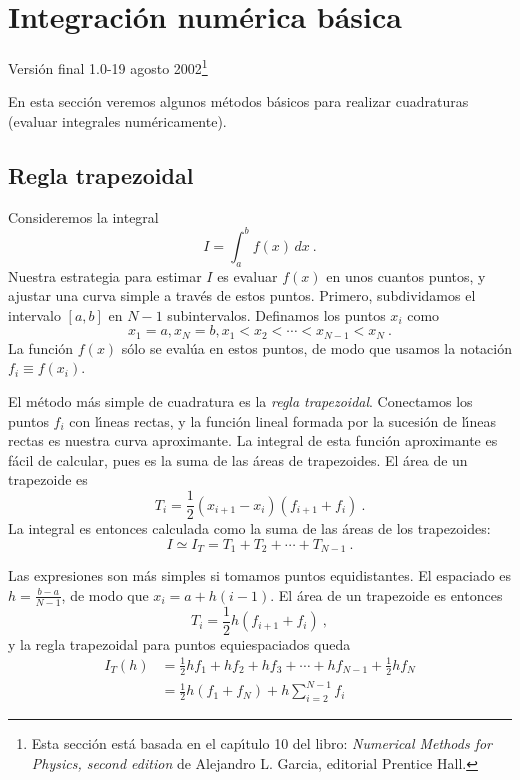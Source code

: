 \documentclass[12pt]{article}
\begin{document}
\section{Integraci\'on num\'erica b\'asica}

\hfill{\tiny Versi\'on final 1.0-19 agosto 2002\footnote{Esta secci\'on
    est\'a basada en el  cap{\'\i}tulo 10 del libro: {\em Numerical
      Methods for Physics, second edition} de Alejandro L. Garcia,
    editorial {\sc Prentice Hall}.}}

En esta secci\'on veremos algunos m\'etodos b\'asicos para
realizar cuadraturas (evaluar integrales num\'ericamente).

\subsection{Regla trapezoidal}

Consideremos la integral
\begin{equation}
I = \int_a^b f(x)\, dx \ .  
\end{equation}
Nuestra estrategia para estimar $I$ es evaluar $f(x)$ en unos cuantos
puntos, y ajustar una curva simple a trav\'es de estos
puntos. Primero, subdividamos el intervalo $[a,b]$ en $N-1$
subintervalos. Definamos los puntos $x_i$ como
$$ x_1=a, x_N=b, x_1<x_2<\cdots<x_{N-1}<x_N \ . $$
La funci\'on $f(x)$ s\'olo se eval\'ua en estos puntos, de modo que
usamos la notaci\'on $f_i\equiv f(x_i)$.

El m\'etodo m\'as simple de cuadratura es la {\em regla
  trapezoidal}. Conectamos los puntos $f_i$ con l\'{\i}neas rectas, y
la funci\'on lineal formada por la sucesi\'on de l\'{\i}neas rectas es
nuestra curva aproximante. La integral de esta funci\'on aproximante
es f\'acil de calcular, pues es la suma de las \'areas de
trapezoides. El \'area de un trapezoide es
$$ T_i = \frac 12 (x_{i+1}-x_i)(f_{i+1}+f_i) \ . $$
La integral es entonces calculada como la suma de las \'areas de los
trapezoides:
$$ I \simeq I_T = T_1 + T_2 + \cdots + T_{N-1} \ . $$

Las expresiones son m\'as simples si tomamos puntos equidistantes. El
espaciado es $h=\frac{b-a}{N-1}$, de modo que $x_i = a+h(i-1)
$. El \'area de un trapezoide es entonces
$$ T_i = \frac 12 h (f_{i+1}+f_i) \ , $$
y la regla trapezoidal para puntos equiespaciados queda
\begin{align}
  I_T(h) &= \frac 12 h f_1 + h f_2 + h f_3 + \cdots + h f_{N-1} +
  \frac 12 h f_N \nonumber \\
&= \frac 12 h(f_1+f_N) + h \sum_{i=2}^{N-1} f_i 
\end{align}
\end{document}
